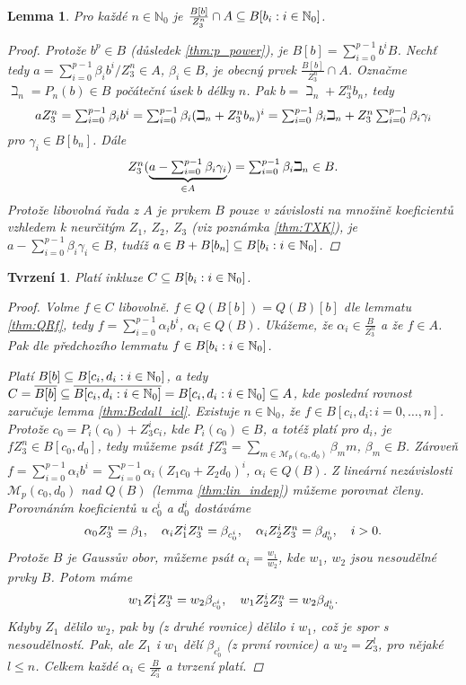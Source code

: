 \documentclass[11pt,a4paper]{article}
\newcommand\m[1]{\mathbb { #1 }} %
\newcommand\p[1]{\mathcal{ #1 }} %
\newcommand\N{\m N}
\newcommand*{\ml}[1]{\[\textstyle\let\displaystyle\textstyle#1\]}	%
\let \icl \overline %
\newcounter{numb}
\theoremstyle{definition}
\theoremstyle{plain}
\newtheorem{lemma}[numb]{Lemma}
\newtheorem{tvrzeni}[numb]{Tvrzení}
\begin{document}
\begin{lemma}
	Pro každé $n \in \N_0$ je $\frac{B[b]}{Z_3^n} \cap A \subseteq \Ball$.
	
	\begin{proof}
		\newcommand*{\I}{_{i = 0}^{p - 1}}
		
		Protože $b^p \in B$ (důsledek \ref{thm:p_power}), je $B[b] = \sum\I b^i B$. Nechť tedy $a = \sum\I \beta_i b^i / Z_3^n \in A$, $\beta_i \in B$, je obecný prvek $\frac{B[b]}{Z_3^n} \cap A$. Označme $\beth_n = P_n(b) \in B$ počáteční úsek $b$ délky $n$. Pak $b = \beth_n + Z_3^n b_n$, tedy
		\ml{
			a Z_3^n = \sum\I \beta_i b^i = \sum\I \beta_i (\beth_n + Z_3^n b_n)^i = \sum\I \beta_i \beth_n + Z_3^n \sum\I \beta_i \gamma_i
		}
		pro $\gamma_i \in B[b_n]$. Dále
		\ml{
			Z_3^n (\underbrace{a - \sum\I \beta_i \gamma_i}_{\in A}) = \sum\I \beta_i \beth_n \in B.
		}
		Protože libovolná řada z $A$ je prvkem $B$ pouze v závislosti na množině koeficientů vzhledem k neurčitým $Z_1$, $Z_2$, $Z_3$ (viz poznámka \ref{thm:TXK}), je $a - \sum\I \beta_i \gamma_i \in B$, tudíž $a \in B + B[b_n] \subseteq \Ball$.
	\end{proof}
\end{lemma}

\begin{tvrzeni}
	Platí inkluze $C \subseteq \Ball$.

	\begin{proof}
		\newcommand*{\I}{_{i = 0}^{p - 1}}
		
		Volme $f \in C$ libovolně. $f \in Q(B[b]) = Q(B)[b]$ dle lemmatu \ref{thm:QRf}, tedy $f = \sum\I \alpha_i b^i$, $\alpha_i \in Q(B)$. Ukážeme, že $\alpha_i \in \frac{B}{Z_3^n}$ a že $f \in A$. Pak dle předchozího lemmatu $f \in \Ball$.
		
		Platí $B[b] \subseteq \Bcdall$, a tedy $C = \icl{B[b]} \subseteq \icl{\Bcdall} = \Bcdall \subseteq A$, kde poslední rovnost zaručuje lemma \ref{thm:Bcdall_icl}. Existuje $n \in \N_0$, že $f \in B[c_i, d_i: i = 0, \hdots, n]$. Protože $c_0 = P_i(c_0) + Z_3^i c_i$, kde $P_i(c_0) \in B$, a totéž platí pro $d_i$, je $f Z_3^n \in B[c_0, d_0]$, tedy můžeme psát $f Z_3^n = \sum_{m \in \p M_p(c_0, d_0)} \beta_m m$, $\beta_m \in B$. Zároveň $f = \sum\I \alpha_i b^i = \sum\I \alpha_i (Z_1 c_0 + Z_2 d_0)^i$, $\alpha_i \in Q(B)$. Z lineární nezávislosti $\p M_p(c_0, d_0)$ nad $Q(B)$ (lemma \ref{thm:lin_indep}) můžeme porovnat členy. Porovnáním koeficientů u $c_0^i$ a $d_0^i$ dostáváme
		\ml{
			\alpha_0 Z_3^n = \beta_1, \quad \alpha_i Z_1^i Z_3^n = \beta_{c_0^i}, \quad \alpha_i Z_2^i Z_3^n = \beta_{d_0^i}, \quad i > 0.
		}
		Protože $B$ je Gaussův obor, můžeme psát $\alpha_i = \frac{w_1}{w_2}$, kde $w_1$, $w_2$ jsou nesoudělné prvky $B$. Potom máme
		\ml{
			w_1 Z_1^i Z_3^n = w_2 \beta_{c_0^i}, \quad w_1 Z_2^i Z_3^n = w_2 \beta_{d_0^i}.
		}
		Kdyby $Z_1$ dělilo $w_2$, pak by (z druhé rovnice) dělilo i $w_1$, což je spor s nesoudělností. Pak, ale $Z_1$ i $w_1$ dělí $\beta_{c_0^i}$ (z první rovnice) a $w_2 = Z_3^l$, pro nějaké $l \leq n$. Celkem každé $\alpha_i \in \frac{B}{Z_3^n}$ a tvrzení platí.
	\end{proof}
\end{tvrzeni}
\end{document}
